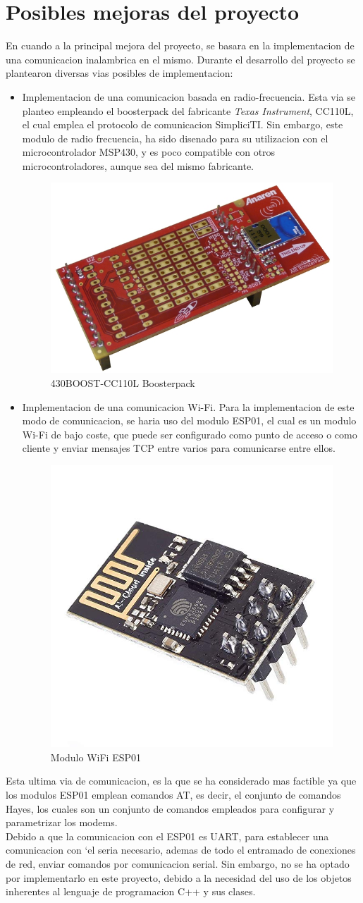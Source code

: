 \documentclass[a4paper,twoside]{article}
\begin{document}
\section{Posibles mejoras del proyecto}
En cuando a la principal mejora del proyecto, se basara en la implementacion de una comunicacion inalambrica en el mismo. Durante el desarrollo del proyecto se plantearon diversas vias posibles de implementacion:
\begin{itemize}
\item Implementacion de una comunicacion basada en radio-frecuencia. Esta via se planteo empleando el boosterpack del fabricante \textit{Texas Instrument}, CC110L, el cual emplea el protocolo de comunicacion SimpliciTI. Sin embargo, este modulo de radio frecuencia, ha sido disenado para su utilizacion con el microcontrolador MSP430, y es poco compatible con otros microcontroladores, aunque sea del mismo fabricante. \\
\begin{figure}[h!]
 \centering
 \includegraphics[width=.3\textwidth]{../images/rf_bp}
 \caption{430BOOST-CC110L Boosterpack}
\end{figure}

\item Implementacion de una comunicacion Wi-Fi. Para la implementacion de este modo de comunicacion, se haria uso del modulo ESP01, el cual es un modulo Wi-Fi de bajo coste, que puede ser configurado como punto de acceso o como cliente y enviar mensajes TCP entre varios para comunicarse entre ellos. \\
\begin{figure}[h!]
 \centering
 \includegraphics[width=.2\textwidth]{../images/esp8266}
 \caption{Modulo WiFi ESP01}
\end{figure}
\end{itemize}

Esta ultima via de comunicacion, es la que se ha considerado mas factible ya que los modulos ESP01 emplean comandos AT, es decir, el conjunto de comandos Hayes, los cuales son un conjunto de comandos empleados para configurar y parametrizar los modems. \\
Debido a que la comunicacion con el ESP01 es UART, para establecer una comunicacion con `el seria necesario, ademas de todo el entramado de conexiones de red, enviar comandos por comunicacion serial. Sin embargo, no se ha optado por implementarlo en este proyecto, debido a la necesidad del uso de los objetos inherentes al lenguaje de programacion C++ y sus clases.
\end{document}
